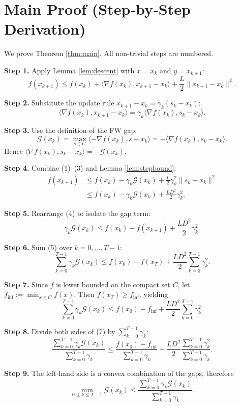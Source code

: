 \documentclass{article}
\newcommand{\gap}{\mathcal{G}}
\begin{document}
\section*{Main Proof (Step‑by‑Step Derivation)}
We prove Theorem \ref{thm:main}. All non‑trivial steps are numbered.

\bigskip
\noindent\textbf{Step 1.} Apply Lemma \ref{lem:descent} with $x=x_k$ and $y=x_{k+1}$:
\[
f(x_{k+1}) \le f(x_k) + \langle \nabla f(x_k),x_{k+1}-x_k\rangle + \frac{L}{2}\|x_{k+1}-x_k\|^2 .
\tag{1}
\]

\noindent\textbf{Step 2.} Substitute the update rule $x_{k+1}-x_k = \gamma_k (s_k-x_k)$:
\[
\langle \nabla f(x_k),x_{k+1}-x_k\rangle = \gamma_k\langle \nabla f(x_k),s_k-x_k\rangle .
\tag{2}
\]

\noindent\textbf{Step 3.} Use the definition of the FW gap:
\[
\gap(x_k)=\max_{s\in C}\langle -\nabla f(x_k),s-x_k\rangle
        = -\langle \nabla f(x_k),s_k-x_k\rangle .
\tag{3}
\]
Hence $\langle \nabla f(x_k),s_k-x_k\rangle = -\gap(x_k)$.

\noindent\textbf{Step 4.} Combine (1)–(3) and Lemma \ref{lem:stepbound}:
\[
\begin{aligned}
f(x_{k+1}) &\le f(x_k) -\gamma_k \gap(x_k) 
            + \frac{L}{2}\gamma_k^2\|s_k-x_k\|^2 \\[4pt]
           &\le f(x_k) -\gamma_k \gap(x_k) + \frac{L D^2}{2}\gamma_k^2 .
\end{aligned}
\tag{4}
\]

\noindent\textbf{Step 5.} Rearrange (4) to isolate the gap term:
\[
\gamma_k\gap(x_k) \le f(x_k)-f(x_{k+1}) + \frac{L D^2}{2}\gamma_k^2 .
\tag{5}
\]

\noindent\textbf{Step 6.} Sum (5) over $k=0,\dots,T-1$:
\[
\sum_{k=0}^{T-1}\gamma_k\gap(x_k) 
   \le f(x_0)-f(x_T) + \frac{L D^2}{2}\sum_{k=0}^{T-1}\gamma_k^2 .
\tag{6}
\]

\noindent\textbf{Step 7.} Since $f$ is lower bounded on the compact set $C$, let $f_{\inf}:=\min_{x\in C}f(x)$.
Then $f(x_T)\ge f_{\inf}$, yielding
\[
\sum_{k=0}^{T-1}\gamma_k\gap(x_k) 
   \le f(x_0)-f_{\inf} + \frac{L D^2}{2}\sum_{k=0}^{T-1}\gamma_k^2 .
\tag{7}
\]

\noindent\textbf{Step 8.} Divide both sides of (7) by $\sum_{k=0}^{T-1}\gamma_k$:
\[
\frac{\sum_{k=0}^{T-1}\gamma_k\gap(x_k)}{\sum_{k=0}^{T-1}\gamma_k}
   \le \frac{f(x_0)-f_{\inf}}{\sum_{k=0}^{T-1}\gamma_k}
      + \frac{L D^2}{2}\frac{\sum_{k=0}^{T-1}\gamma_k^2}{\sum_{k=0}^{T-1}\gamma_k} .
\tag{8}
\]

\noindent\textbf{Step 9.} The left‑hand side is a convex combination of the gaps, therefore
\[
\min_{0\le k\le T-1}\gap(x_k) 
   \le \frac{\sum_{k=0}^{T-1}\gamma_k\gap(x_k)}{\sum_{k=0}^{T-1}\gamma_k} .
\tag{9}
\]
\end{document}
